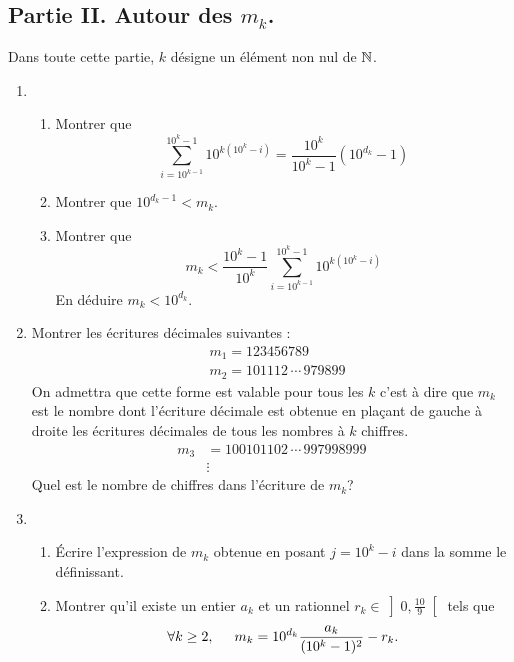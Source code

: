 \subsection*{Partie II. Autour des $m_k$.}
Dans toute cette partie, $k$ désigne un élément non nul de $\mathbb{N}$.
\begin{enumerate}
 \item
\begin{enumerate}
 \item Montrer que
\begin{displaymath}
 \sum_{i=10^{k-1}}^{10^k -1}10^{k(10^k -i)} = \frac{10^k}{10^k -1}\left( 10^{d_k} - 1\right) 
\end{displaymath}
 \item Montrer que $10^{d_k -1}< m_k$.
 \item Montrer que
\begin{displaymath}
 m_k < \frac{10^k - 1}{10^k}\sum_{i=10^{k-1}}^{10^k -1}10^{k(10^k -i)}
\end{displaymath}
En déduire $m_k < 10^{d_k}$.
\end{enumerate}

\item 
Montrer les écritures décimales suivantes :
\begin{align*}
 &m_1 = 123456789\\
 &m_2 = 101112\, \cdots \,97 98 99
\end{align*}
On admettra que cette forme est valable pour tous les $k$ c'est à dire que $m_k$ est le nombre dont l'écriture décimale est obtenue en plaçant de gauche à droite les écritures décimales de tous les nombres à $k$ chiffres.
\begin{align*}
 m_3 &= 100101102\, \cdots\, 997 998 999\\ &\vdots
\end{align*}
Quel est le nombre de chiffres dans l'écriture de $m_k$?

 \item 
\begin{enumerate}
 \item \'Ecrire l'expression de $m_k$ obtenue en posant $j = 10^k -i$ dans la somme le définissant.
 \item Montrer qu'il existe un entier $a_k$ et un rationnel $r_k\in \left] 0, \frac{10}{9} \right[ $ tels que
\begin{displaymath}
\forall k \geq 2,\hspace{0.5cm} m_k = 10^{d_k}\frac{a_k}{(10^k -1)^2} - r_k .
\end{displaymath}
\end{enumerate}

\end{enumerate}

